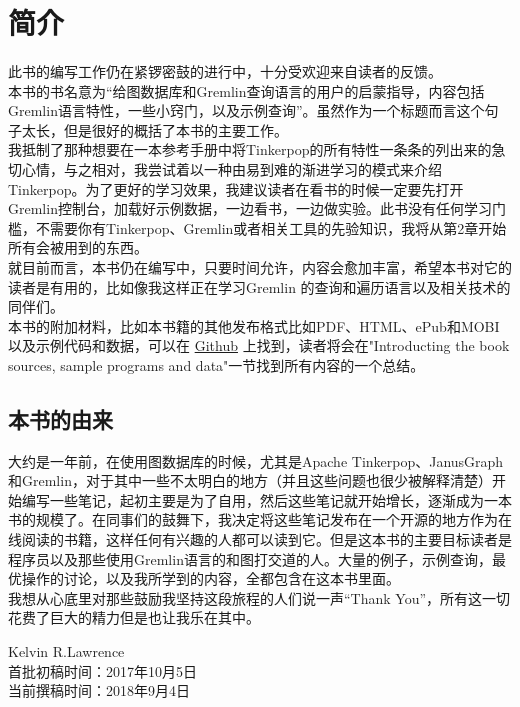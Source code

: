 \documentclass[UTF8]{ctexart}
\begin{document}
\section{简介}

\paragraph{}
\indent 此书的编写工作仍在紧锣密鼓的进行中，十分受欢迎来自读者的反馈。\\
\indent 本书的书名意为“给图数据库和Gremlin查询语言的用户的启蒙指导，内容包括Gremlin语言特性，一些小窍门，以及示例查询”。虽然作为一个标题而言这个句子太长，但是很好的概括了本书的主要工作。\\
\indent 我抵制了那种想要在一本参考手册中将Tinkerpop的所有特性一条条的列出来的急切心情，与之相对，我尝试着以一种由易到难的渐进学习的模式来介绍Tinkerpop。为了更好的学习效果，我建议读者在看书的时候一定要先打开Gremlin控制台，加载好示例数据，一边看书，一边做实验。此书没有任何学习门槛，不需要你有Tinkerpop、Gremlin或者相关工具的先验知识，我将从第2章开始所有会被用到的东西。\\
\indent 就目前而言，本书仍在编写中，只要时间允许，内容会愈加丰富，希望本书对它的读者是有用的，比如像我这样正在学习Gremlin 的查询和遍历语言以及相关技术的同伴们。\\
\indent 本书的附加材料，比如本书籍的其他发布格式比如PDF、HTML、ePub和MOBI以及示例代码和数据，可以在 \href{https://github.com/krlawrence/graph}{Github} 上找到，读者将会在"Introducting the book sources, sample programs and data"一节找到所有内容的一个总结。

\subsection{本书的由来}
\indent 大约是一年前，在使用图数据库的时候，尤其是Apache Tinkerpop、JanusGraph和Gremlin，对于其中一些不太明白的地方（并且这些问题也很少被解释清楚）开始编写一些笔记，起初主要是为了自用，然后这些笔记就开始增长，逐渐成为一本书的规模了。在同事们的鼓舞下，我决定将这些笔记发布在一个开源的地方作为在线阅读的书籍，这样任何有兴趣的人都可以读到它。但是这本书的主要目标读者是程序员以及那些使用Gremlin语言的和图打交道的人。大量的例子，示例查询，最优操作的讨论，以及我所学到的内容，全都包含在这本书里面。\\

\indent 我想从心底里对那些鼓励我坚持这段旅程的人们说一声“Thank You”，所有这一切花费了巨大的精力但是也让我乐在其中。

\begin{flushleft}
Kelvin R.Lawrence\\
首批初稿时间：2017年10月5日\\
当前撰稿时间：2018年9月4日\\
\end{flushleft}
\end{document}
